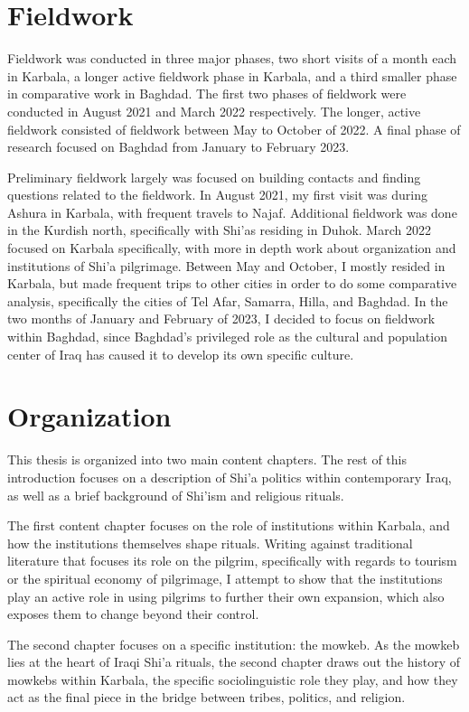 \section{Fieldwork}

Fieldwork was conducted in three major phases, two short visits of a month each in Karbala, a longer active fieldwork phase in Karbala, and a third smaller phase in comparative work in Baghdad. The first two phases of fieldwork were conducted in August 2021 and March 2022 respectively. The longer, active fieldwork consisted of fieldwork between May to October of 2022. A final phase of research focused on Baghdad from January to February 2023. 

Preliminary fieldwork largely was focused on building contacts and finding questions related to the fieldwork. In August 2021, my first visit was during Ashura in Karbala, with frequent travels to Najaf. Additional fieldwork was done in the Kurdish north, specifically with Shi'as residing in Duhok. March 2022 focused on Karbala specifically, with more in depth work about organization and institutions of Shi'a pilgrimage. Between May and October, I mostly resided in Karbala, but made frequent trips to other cities in order to do some comparative analysis, specifically the cities of Tel Afar, Samarra, Hilla, and Baghdad. In the two months of January and February of 2023, I decided to focus on fieldwork within Baghdad, since Baghdad's privileged role as the cultural and population center of Iraq has caused it to develop its own specific culture. 

\section{Organization}

This thesis is organized into two main content chapters. The rest of this introduction focuses on a description of Shi'a politics within contemporary Iraq, as well as a brief background of Shi'ism and religious rituals.

The first content chapter focuses on the role of institutions within Karbala, and how the institutions themselves shape rituals. Writing against traditional literature that focuses its role on the pilgrim, specifically with regards to tourism or the spiritual economy of pilgrimage, I attempt to show that the institutions play an active role in using pilgrims to further their own expansion, which also exposes them to change beyond their control. 

The second chapter focuses on a specific institution: the mowkeb. As the mowkeb lies at the heart of Iraqi Shi'a rituals, the second chapter draws out the history of mowkebs within Karbala, the specific sociolinguistic role they play, and how they act as the final piece in the bridge between tribes, politics, and religion. 

